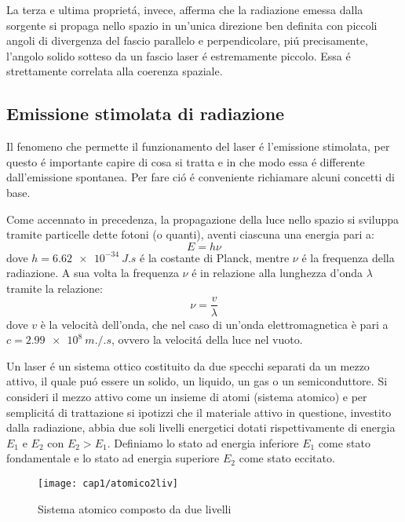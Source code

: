 La terza e ultima propriet\'a, invece, afferma che la radiazione emessa dalla sorgente si propaga nello spazio in un'unica direzione ben definita con piccoli angoli di divergenza del fascio parallelo e perpendicolare, pi\'u precisamente, l'angolo solido sotteso da un fascio laser \'e estremamente piccolo. Essa \'e strettamente correlata alla coerenza spaziale.


\subsection{Emissione stimolata di radiazione}
Il fenomeno che permette il funzionamento del laser \'e l'emissione stimolata, per questo \'e importante capire di cosa si tratta e in che modo essa \'e differente dall'emissione spontanea. Per fare ci\'o \'e conveniente richiamare alcuni concetti di base.

Come accennato in precedenza, la propagazione della luce nello spazio si sviluppa tramite particelle dette fotoni (o quanti), aventi ciascuna una energia pari a:
\begin{equation}
E=h\nu
\end{equation}
dove $h= \SI{6.62e-34}{J.s}$ \'e la costante di Planck, mentre $\nu$ \'e la frequenza della radiazione. A sua volta la frequenza $\nu$ \'e in relazione alla lunghezza d'onda $\lambda$ tramite la relazione:
\begin{equation}
\nu= \frac{v}{\lambda}
\end{equation}
dove $v$ è la velocità dell'onda, che nel caso di un'onda elettromagnetica è pari a $c= \SI{2.99e8}{m.\per.s}$, ovvero la velocit\'a della luce nel vuoto.

Un laser \'e un sistema ottico costituito da due specchi separati da un mezzo attivo, il quale pu\'o essere un solido, un liquido, un gas o un semiconduttore. Si consideri il mezzo attivo come un insieme di atomi (sistema atomico) e per semplicit\'a di trattazione si ipotizzi che il materiale attivo in questione, investito dalla radiazione, abbia due soli livelli energetici dotati rispettivamente di energia $E_{1}$ e $E_{2}$ con $E_{2}>E_{1}$. Definiamo lo stato ad energia inferiore $E_{1}$ come stato fondamentale e lo stato ad energia superiore $E_{2}$ come stato eccitato.
\begin{figure}[H]
  \begin{center}
    \texttt{[image: cap1/atomico2liv]}
    \caption{Sistema atomico composto da due livelli}
    \label{atomico2liv}
  \end{center}
\end{figure}

